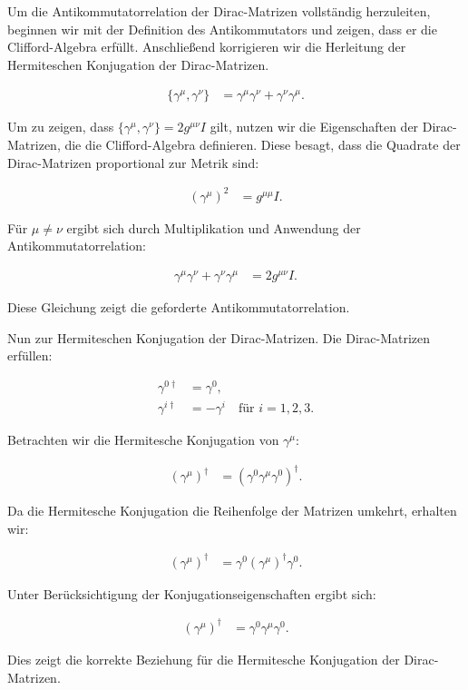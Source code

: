 Um die Antikommutatorrelation der Dirac-Matrizen vollständig herzuleiten, beginnen wir mit der Definition des Antikommutators und zeigen, dass er die Clifford-Algebra erfüllt. Anschließend korrigieren wir die Herleitung der Hermiteschen Konjugation der Dirac-Matrizen.

\begin{align*}
\{\gamma^\mu, \gamma^\nu\} &= \gamma^\mu \gamma^\nu + \gamma^\nu \gamma^\mu.
\end{align*}

Um zu zeigen, dass \(\{\gamma^\mu, \gamma^\nu\} = 2 g^{\mu \nu} I\) gilt, nutzen wir die Eigenschaften der Dirac-Matrizen, die die Clifford-Algebra definieren. Diese besagt, dass die Quadrate der Dirac-Matrizen proportional zur Metrik sind:

\begin{align*}
(\gamma^\mu)^2 &= g^{\mu \mu} I.
\end{align*}

Für \(\mu \neq \nu\) ergibt sich durch Multiplikation und Anwendung der Antikommutatorrelation:

\begin{align*}
\gamma^\mu \gamma^\nu + \gamma^\nu \gamma^\mu &= 2 g^{\mu \nu} I.
\end{align*}

Diese Gleichung zeigt die geforderte Antikommutatorrelation.

Nun zur Hermiteschen Konjugation der Dirac-Matrizen. Die Dirac-Matrizen erfüllen:

\begin{align*}
\gamma^{0 \dagger} &= \gamma^0, \\
\gamma^{i \dagger} &= -\gamma^i \quad \text{für } i = 1, 2, 3.
\end{align*}

Betrachten wir die Hermitesche Konjugation von \(\gamma^\mu\):

\begin{align*}
(\gamma^\mu)^\dagger &= (\gamma^0 \gamma^\mu \gamma^0)^\dagger.
\end{align*}

Da die Hermitesche Konjugation die Reihenfolge der Matrizen umkehrt, erhalten wir:

\begin{align*}
(\gamma^\mu)^\dagger &= \gamma^0 (\gamma^\mu)^\dagger \gamma^0.
\end{align*}

Unter Berücksichtigung der Konjugationseigenschaften ergibt sich:

\begin{align*}
(\gamma^\mu)^\dagger &= \gamma^0 \gamma^\mu \gamma^0.
\end{align*}

Dies zeigt die korrekte Beziehung für die Hermitesche Konjugation der Dirac-Matrizen.

